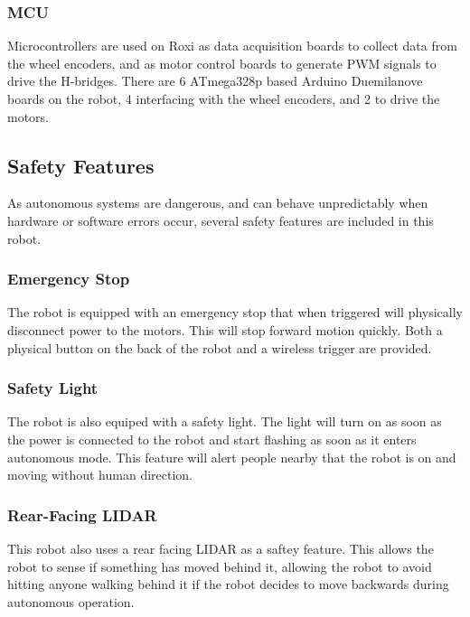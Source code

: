 \subsubsection{MCU}

Microcontrollers are used on Roxi as data acquisition boards to collect data from the wheel encoders, and as motor control boards to generate PWM signals to drive the H-bridges. There are 6 ATmega328p based Arduino Duemilanove boards on the robot, 4 interfacing with the wheel encoders, and 2 to drive the motors.

\subsection{Safety Features}

As autonomous systems are dangerous, and can behave unpredictably when hardware or software errors occur, several safety features are included in this robot.

\subsubsection{Emergency Stop}

The robot is equipped with an emergency stop that when triggered will physically disconnect power to the motors. This will stop forward motion quickly. Both a physical button on the back of the robot and a wireless trigger are provided.

\subsubsection{Safety Light}
The robot is also equiped with a safety light. The light will turn on as soon as the power is connected to the robot and start flashing as soon as it enters autonomous mode. This feature will alert people nearby that the robot is on and moving without human direction.

\subsubsection{Rear-Facing LIDAR}

This robot also uses a rear facing LIDAR as a saftey feature. This allows the robot to sense if something has moved behind it, allowing the robot to avoid hitting anyone walking behind it if the robot decides to move backwards during autonomous operation.
